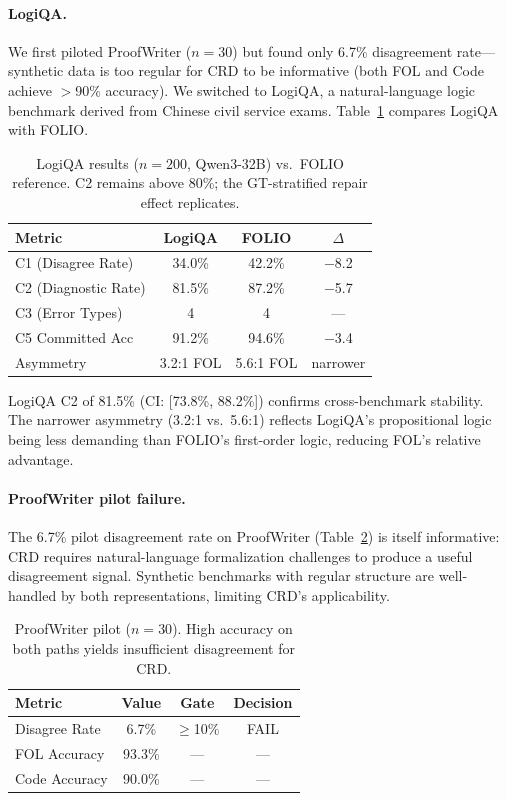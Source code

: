 \documentclass[11pt,a4paper]{article}
\newcommand{\pp}{\text{pp}}
\begin{document}
\paragraph{LogiQA.} We first piloted ProofWriter ($n\!=\!30$) but found only 6.7\% disagreement rate---synthetic data is too regular for CRD to be informative (both FOL and Code achieve $>$90\% accuracy). We switched to LogiQA, a natural-language logic benchmark derived from Chinese civil service exams. Table~\ref{tab:logiqa} compares LogiQA with FOLIO.

\begin{table}[t]
\centering
\small
\begin{tabular}{lccc}
\toprule
\textbf{Metric} & \textbf{LogiQA} & \textbf{FOLIO} & $\Delta$ \\
\midrule
C1 (Disagree Rate) & 34.0\% & 42.2\% & $-$8.2\pp{} \\
C2 (Diagnostic Rate) & 81.5\% & 87.2\% & $-$5.7\pp{} \\
C3 (Error Types) & 4 & 4 & --- \\
C5 Committed Acc & 91.2\% & 94.6\% & $-$3.4\pp{} \\
Asymmetry & 3.2:1 FOL & 5.6:1 FOL & narrower \\
\bottomrule
\end{tabular}
\caption{LogiQA results ($n\!=\!200$, Qwen3-32B) vs.\ FOLIO reference. C2 remains above 80\%; the GT-stratified repair effect replicates.}
\label{tab:logiqa}
\end{table}

LogiQA C2 of 81.5\% (CI: [73.8\%, 88.2\%]) confirms cross-benchmark stability. The narrower asymmetry (3.2:1 vs.\ 5.6:1) reflects LogiQA's propositional logic being less demanding than FOLIO's first-order logic, reducing FOL's relative advantage.

\paragraph{ProofWriter pilot failure.} The 6.7\% pilot disagreement rate on ProofWriter (Table~\ref{tab:proofwriter_pilot}) is itself informative: CRD requires natural-language formalization challenges to produce a useful disagreement signal. Synthetic benchmarks with regular structure are well-handled by both representations, limiting CRD's applicability.

\begin{table}[t]
\centering
\small
\begin{tabular}{lccc}
\toprule
\textbf{Metric} & \textbf{Value} & \textbf{Gate} & \textbf{Decision} \\
\midrule
Disagree Rate & 6.7\% & $\geq$10\% & FAIL \\
FOL Accuracy & 93.3\% & --- & --- \\
Code Accuracy & 90.0\% & --- & --- \\
\bottomrule
\end{tabular}
\caption{ProofWriter pilot ($n\!=\!30$). High accuracy on both paths yields insufficient disagreement for CRD.}
\label{tab:proofwriter_pilot}
\end{table}
\end{document}
